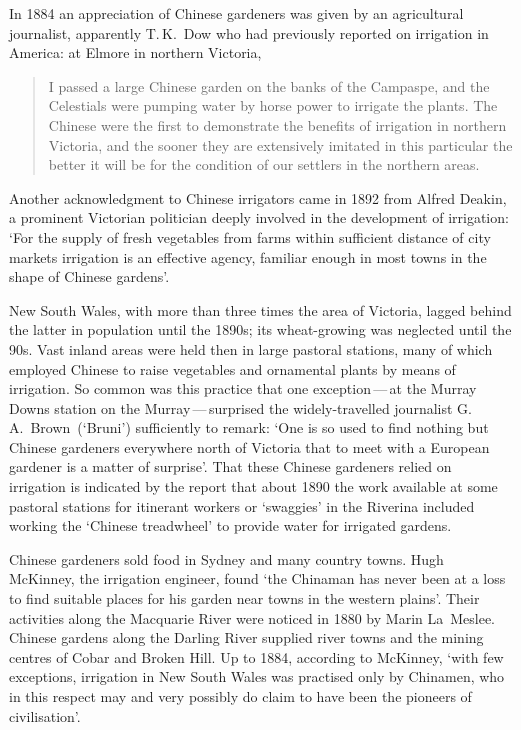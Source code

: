 In 1884 an appreciation of Chinese gardeners was given by an
agricultural journalist, apparently T.\,K.~Dow who had previously
reported on irrigation in America: at Elmore in northern Victoria,
\begin{quote}
	I passed a large Chinese garden on the banks of the Campaspe,
	and the Celestials were pumping water by horse power to
	irrigate the plants.  The Chinese were the first to
	demonstrate the benefits of irrigation in northern Victoria,
	and the sooner they are extensively imitated in this
	particular the better it will be for the condition of our
	settlers in the northern areas.
\end{quote}

Another acknowledgment to Chinese irrigators came in 1892 from Alfred
Deakin, a prominent Victorian politician deeply involved in the
development of irrigation: `For the supply of fresh vegetables from
farms within sufficient distance of city markets irrigation is an
effective agency, familiar enough in most towns in the shape of
Chinese gardens'.

New South Wales, with more than three times the area of Victoria,
lagged behind the latter in population until the 1890s; its
wheat-growing was neglected until the 90s.  Vast inland areas were
held then in large pastoral stations, many of which employed Chinese
to raise vegetables and ornamental plants by means of irrigation.  So
common was this practice that one exception\,---\,at the Murray Downs
station on the Murray\,---\,surprised the widely-travelled journalist
G.\,A.~Brown~(`Bruni') sufficiently to remark: `One is so used to find
nothing but Chinese gardeners everywhere north of Victoria that to
meet with a European gardener is a matter of surprise'.  That these
Chinese gardeners relied on irrigation is indicated by the report that
about 1890 the work available at some pastoral stations for itinerant
workers or `swaggies' in the Riverina included working the `Chinese
treadwheel' to provide water for irrigated
gardens.

Chinese gardeners sold food in Sydney and many country towns. Hugh
McKinney, the irrigation engineer, found `the Chinaman has never been
at a loss to find suitable places for his garden near towns in the
western plains'.  Their activities along the Macquarie River were
noticed in 1880 by Marin La~Meslee.  Chinese gardens along the Darling
River supplied river towns and the mining centres of Cobar and Broken
Hill.  Up to 1884, according to McKinney, `with few exceptions,
irrigation in New South Wales was practised only by Chinamen, who in
this respect may and very possibly do claim to have been the pioneers
of civilisation'.

